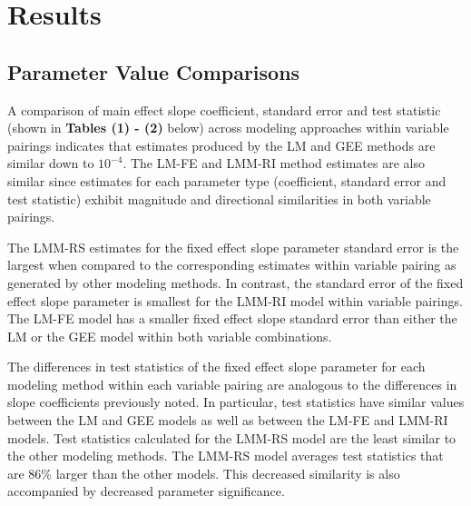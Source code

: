 \documentclass[12pt,]{article}
\begin{document}
\hypertarget{results}{%
\section{Results}\label{results}}

\hypertarget{parameter-value-comparisons}{%
\subsection{Parameter Value
Comparisons}\label{parameter-value-comparisons}}

A comparison of main effect slope coefficient, standard error and test
statistic (shown in \textbf{Tables (1) - (2)} below) across modeling
approaches within variable pairings indicates that estimates produced by
the LM and GEE methods are similar down to \(10^{-4}\). The LM-FE and
LMM-RI method estimates are also similar since estimates for each
parameter type (coefficient, standard error and test statistic) exhibit
magnitude and directional similarities in both variable pairings.

The LMM-RS estimates for the fixed effect slope parameter standard error
is the largest when compared to the corresponding estimates within
variable pairing as generated by other modeling methods. In contrast,
the standard error of the fixed effect slope parameter is smallest for
the LMM-RI model within variable pairings. The LM-FE model has a smaller
fixed effect slope standard error than either the LM or the GEE model
within both variable combinations.

The differences in test statistics of the fixed effect slope parameter
for each modeling method within each variable pairing are analogous to
the differences in slope coefficients previously noted. In particular,
test statistics have similar values between the LM and GEE models as
well as between the LM-FE and LMM-RI models. Test statistics calculated
for the LMM-RS model are the least similar to the other modeling
methods. The LMM-RS model averages test statistics that are 86\% larger
than the other models. This decreased similarity is also accompanied by
decreased parameter significance.

\vspace{5pt}
\end{document}
